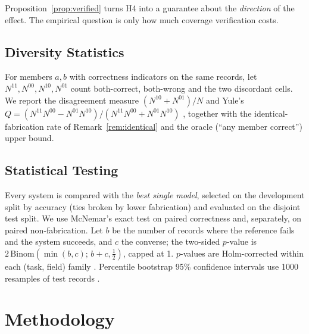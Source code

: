 \documentclass[11pt]{article}
\begin{document}
Proposition~\ref{prop:verified} turns H4 into a guarantee about the \emph{direction} of the effect. The empirical question is only how much coverage verification costs.

\subsection{Diversity Statistics}
For members $a,b$ with correctness indicators on the same records, let $N^{11},N^{00},N^{10},N^{01}$ count both-correct, both-wrong and the two discordant cells. We report the disagreement measure $(N^{10}+N^{01})/N$ and Yule's $Q=(N^{11}N^{00}-N^{01}N^{10})/(N^{11}N^{00}+N^{01}N^{10})$ \citep{kuncheva2003}, together with the identical-fabrication rate of Remark~\ref{rem:identical} and the oracle (``any member correct'') upper bound.

\subsection{Statistical Testing}
Every system is compared with the \emph{best single model}, selected on the development split by accuracy (ties broken by lower fabrication) and evaluated on the disjoint test split. We use McNemar's exact test \citep{mcnemar1947} on paired correctness and, separately, on paired non-fabrication. Let $b$ be the number of records where the reference fails and the system succeeds, and $c$ the converse; the two-sided $p$-value is $2\,\mathrm{Binom}(\min(b,c);\,b{+}c,\tfrac12)$, capped at 1. $p$-values are Holm-corrected within each (task, field) family \citep{holm1979}. Percentile bootstrap 95\% confidence intervals use 1000 resamples of test records \citep{efron1993}.

\section{Methodology}\label{sec:method}
\end{document}
